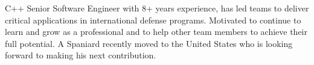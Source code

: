

\begin{cvparagraph}

C++ Senior Software Engineer with 8+ years experience, has led teams to deliver critical applications in international defense programs. Motivated to continue to learn and grow as a professional and to help other team members to achieve their full potential. A Spaniard recently moved to the United States who is looking forward to making his next contribution.
\end{cvparagraph}
